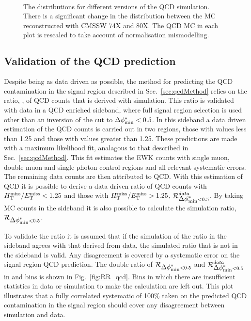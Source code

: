 \begin{figure}[!h]
{  } \\
  \caption{The \mhtmet distributions for different versions of the QCD
  simulation. There is a significant change in the distribution
  between the MC reconstructed with CMSSW 74X and 80X. The QCD MC in
  each plot is rescaled to take account of normalisation mismodelling.}
  \label{fig:mhtDivMetChange}
\end{figure}


\subsection{Validation of the QCD prediction}
\label{sec:qcdValidation}

Despite being as data driven as possible, the method for predicting the QCD contamination in the signal region
described in Sec.~\ref{sec:qcdMethod} relies on the ratio, \rmhtmet,
of QCD counts
that is derived with simulation. This ratio is validated with data in a
QCD enriched sideband, where full signal region selection is used
other than
an inversion of the \bdphi cut to $\mbox{$\Delta\phi^{*}_{\rm min}$}<0.5$. In this sideband a
data driven estimation of the QCD counts is carried out in two regions, those with \mhtmet values less than
1.25 and those with values greater than 1.25. These predictions are
made with a maximum likelihood
fit, analagous to that described in Sec.~\ref{sec:qcdMethod}. This fit
estimates the EWK counts with single muon, double muon and single
photon control regions and all relevant systematic errors. The
remaining data counts are then attributed to QCD. With this estimation 
of QCD it is possible to derive a data driven ratio of QCD counts with 
$\mbox{$\mbox{$H_{\rm T}^{\rm miss}$} / \mbox{$E_\text{T}^{\rm miss}$}$}<1.25$ and those with $\mbox{$\mbox{$H_{\rm T}^{\rm miss}$} / \mbox{$E_\text{T}^{\rm miss}$}$}>1.25$, $\mbox{$\mathcal{R}$}_{\mbox{$\Delta\phi^{*}_{\rm min}$}<0.5}^{data}$. By
taking MC counts in the \bdphi sideband it is also possible to
calculate the \mhtmet simulation ratio, $\mbox{$\mathcal{R}$}_{\mbox{$\Delta\phi^{*}_{\rm min}$}<0.5}$. 

To
validate the ratio \rmhtmet it is assumed that if the simulation of
the ratio in the \bdphi sideband agrees with that
derived from data, the simulated ratio that is not in the sideband
is valid. Any disagreement is covered by 
a systematic error on the signal region QCD prediction. The double ratio of
$\mbox{$\mathcal{R}$}_{\mbox{$\Delta\phi^{*}_{\rm min}$}<0.5}$ and $\mbox{$\mathcal{R}$}_{\mbox{$\Delta\phi^{*}_{\rm min}$}<0.5}^{data}$ in \scalht
and \njet bins is shown in Fig.~\ref{fig:RR_qcd}. Bins in which there
are insufficient statistics in data or simulation to make the calculation are left out.
This
plot illustrates that a fully correlated systematic of 100\% taken on the
predicted QCD contamination in the signal region should cover any
disagreement between simulation and data.

